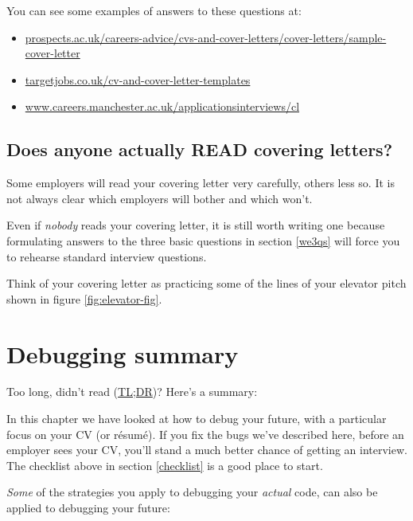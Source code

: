 \documentclass[
]{book}
\providecommand{\tightlist}{%
  \setlength{\itemsep}{0pt}\setlength{\parskip}{0pt}}
\begin{document}
You can see some examples of answers to these questions at:

\begin{itemize}
\tightlist
\item
  \href{https://www.prospects.ac.uk/careers-advice/cvs-and-cover-letters/cover-letters/sample-cover-letter}{prospects.ac.uk/careers-advice/cvs-and-cover-letters/cover-letters/sample-cover-letter}
\item
  \href{https://targetjobs.co.uk/cv-and-cover-letter-templates}{targetjobs.co.uk/cv-and-cover-letter-templates}
\item
  \href{https://www.careers.manchester.ac.uk/applicationsinterviews/cl/}{www.careers.manchester.ac.uk/applicationsinterviews/cl}
\end{itemize}

\hypertarget{elevatorpitch}{%
\subsection{Does anyone actually READ covering letters?}\label{elevatorpitch}}

Some employers will read your covering letter very carefully, others less so. It is not always clear which employers will bother and which won't.

Even if \emph{nobody} reads your covering letter, it is still worth writing one because formulating answers to the three basic questions in section \ref{we3qs} will force you to rehearse standard interview questions.

Think of your covering letter as practicing some of the lines of your elevator pitch shown in figure \ref{fig:elevator-fig}.

\hypertarget{tldr7}{%
\section{Debugging summary}\label{tldr7}}

Too long, didn't read (\href{https://en.wiktionary.org/wiki/too_long;_didn\%27t_read}{TL;DR})? Here's a summary:

In this chapter we have looked at how to debug your future, with a particular focus on your CV (or résumé). If you fix the bugs we've described here, before an employer sees your CV, you'll stand a much better chance of getting an interview. The checklist above in section \ref{checklist} is a good place to start.

\emph{Some} of the strategies you apply to debugging your \emph{actual} code, can also be applied to debugging your future:
\end{document}
